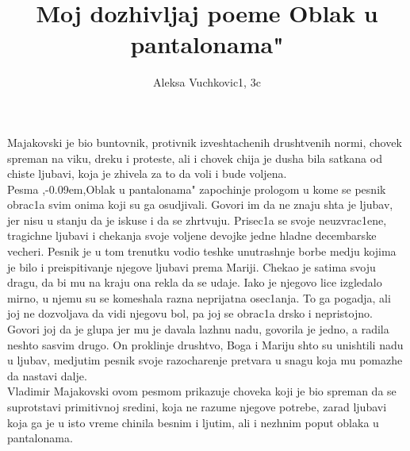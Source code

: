 \documentclass[11pt]{article}
\title{\bf{Moj dozhivljaj poeme \zn Oblak u pantalonama"}}
\author{\Large Aleksa Vuchkovic1, 3c}
\date{}
\def \zn{,\kern-0.09em,}
\begin{document}
\maketitle
\large Majakovski je bio buntovnik, protivnik izveshtachenih drushtvenih normi, chovek spreman na viku, dreku i proteste, ali i chovek chija je dusha bila satkana od chiste ljubavi, koja je zhivela za to da voli i bude voljena.\\

Pesma \zn Oblak u pantalonama" zapochinje prologom u kome se pesnik obrac1a svim onima koji su ga osudjivali. Govori im da ne znaju shta je ljubav, jer nisu u stanju da je iskuse i da se zhrtvuju. Prisec1a se svoje neuzvrac1ene, tragichne ljubavi i chekanja svoje voljene devojke jedne hladne decembarske vecheri. Pesnik je u tom trenutku vodio teshke unutrashnje borbe medju kojima je bilo i preispitivanje njegove ljubavi prema Mariji. Chekao je satima svoju dragu, da bi mu na kraju ona rekla da se udaje. Iako je njegovo lice izgledalo mirno, u njemu su se komeshala razna neprijatna osec1anja. To ga pogadja, ali joj ne dozvoljava da vidi njegovu bol, pa joj se obrac1a drsko i nepristojno. Govori joj da je glupa jer mu je davala lazhnu nadu, govorila je jedno, a radila neshto sasvim drugo. On proklinje drushtvo, Boga i Mariju shto su unishtili nadu u ljubav, medjutim pesnik svoje razocharenje pretvara u snagu koja mu pomazhe da nastavi dalje.\\

Vladimir Majakovski ovom pesmom prikazuje choveka koji je bio spreman da se suprot\/stavi primitivnoj sredini, koja ne razume njegove potrebe, zarad ljubavi koja ga je u isto vreme chinila besnim i ljutim, ali i nezhnim poput oblaka u pantalonama.
\end{document}
